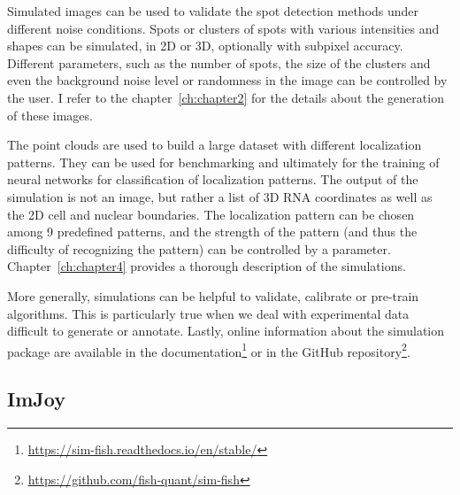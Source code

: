 
Simulated images can be used to validate the spot detection methods under different noise conditions.
Spots or clusters of spots with various intensities and shapes can be simulated, in 2D or 3D, optionally with subpixel accuracy.
Different parameters, such as the number of spots, the size of the clusters and even the background noise level or randomness in the image can be controlled by the user.
I refer to the chapter~\ref{ch:chapter2} for the details about the generation of these images.

The point clouds are used to build a large dataset with different localization patterns. They can be used for benchmarking and ultimately for the training of neural networks for classification of localization patterns. 
The output of the simulation is not an image, but rather a list of 3D \ac{RNA} coordinates as well as the 2D cell and nuclear boundaries. 
The localization pattern can be chosen among 9 predefined patterns, and the strength of the pattern (and thus the difficulty of recognizing the pattern) can be controlled by a parameter. 
Chapter~\ref{ch:chapter4} provides a thorough description of the simulations.

More generally, simulations can be helpful to validate, calibrate or pre-train algorithms. This is particularly true when we deal with experimental data difficult to generate or annotate. 
Lastly, online information about the simulation package are available in the documentation\footnote{\url{https://sim-fish.readthedocs.io/en/stable/}} or in the GitHub repository\footnote{\url{https://github.com/fish-quant/sim-fish}}.

\subsection{ImJoy}
\label{subsec:imjoy}

